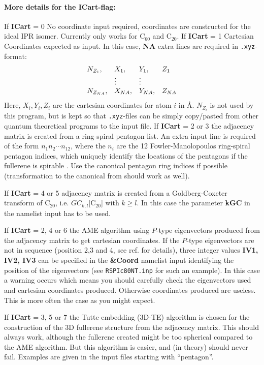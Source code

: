 \documentclass[article,a4paper,twoside]{memoir}
\newcommand{\C}[1]{\ensuremath{\mathrm{C}_{#1}}}
\newcommand{\filename}[1]{\texttt{#1}}
\newcommand{\paramname}[1]{{\color{green}\textbf{#1}}}
\begin{document}
\paragraph{More details for the \paramname{ICart}-flag:} 
If \paramname{ICart} = 0 No coordinate input required, coordinates are constructed for the ideal IPR isomer.
Currently only works for \C{60} and \C{20}.
If \paramname{ICart} = 1 Cartesian Coordinates expected as input. In this case, \paramname{NA} extra lines are required in \filename{.xyz}-format:
\[
\begin{array}{{llll}}
  N_{Z_1},& X_1,& Y_1,& Z_1\\
         &\vdots&\vdots& \\
  N_{{Z_{NA}}},& X_{NA},& Y_{NA},& Z_{NA}\\
\end{array}
\]
Here, $X_i, Y_i, Z_i$ are the cartesian
coordinates for atom $i$ in \AA. $N_{Z_i}$ is not used by
this program, but is kept so that \filename{.xyz}-files can be simply copy/pasted from other quantum theoretical programs to the input file.
If \paramname{ICart} = 2 or 3 the adjacency matrix is created from a ring-spiral pentagon list. An extra input line is required 
of the form $n_1 n_2 \cdots n_{12}$, where the $n_i$ are the 12 Fowler-Manolopoulos ring-spiral
pentagon indices, which uniquely identify the locations of the
pentagons if the fullerene is spirable \cite{Atlas}. Use the canonical
pentagon ring indices if possible (transformation to the canonical from should work as well).

If \paramname{ICart} = 4 or 5 adjacency matrix is created from a Goldberg-Coxeter transform of \C{20}, i.e. $GC_{k,l}$[\C{20}] with $k \geq l$.  
In this case the parameter \paramname{kGC} in the namelist input has to be used.

If \paramname{ICart} = 2, 4 or 6 the AME algorithm using $P$-type eigenvectors produced from the adjacency matrix to get cartesian
coordinates.  If the $P$-type eigenvectors are not in sequence (position 2,3 and 4, see ref.\cite{Atlas} for details), three integer
values \paramname{IV1, IV2, IV3} can be specified in the \paramname{\&Coord} namelist input identifying the position of the eigenvectors (see
\filename{RSPIc80NT.inp} for such an example).  In this case a warning occurs which means you should carefully check the eigenvectors used and
cartesian coordinates produced. Otherwise coordinates produced are useless. This is more often the case as you might expect.

If \paramname{ICart} = 3, 5 or 7 the Tutte embedding (3D-TE) algorithm is chosen for the construction of the 3D fullerene structure from the
adjacency matrix.  This should always work, although the fullerene created might be too spherical compared to the AME algorithm. But this
algorithm is easier, and (in theory) should never fail. Examples are given in the input files starting with ``pentagon''.
\end{document}
